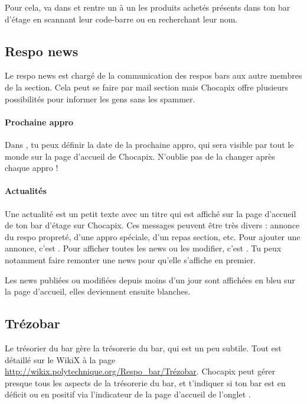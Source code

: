 \documentclass[12pt,french]{article}
\begin{document}
Pour cela, va dans  et rentre un à un les produits achetés présents dans ton bar d'étage en scannant leur code-barre ou en recherchant leur nom.

\subsection{Respo news}

Le respo news est chargé de la communication des respos bars aux autre membres de la section. Cela peut se faire par mail section mais Chocapix offre plusieurs possibilités pour informer les gens sans les spammer.

\paragraph{Prochaine appro} Dans , tu peux définir la date de la prochaine appro, qui sera visible par tout le monde sur la page d'accueil de Chocapix. N'oublie pas de la changer après chaque appro !

\paragraph{Actualités} Une actualité est un petit texte avec un titre qui est affiché sur la page d'accueil de ton bar d'étage sur Chocapix. Ces messages peuvent être très divers : annonce du respo propreté, d'une appro spéciale, d'un repas section, etc. Pour ajouter une annonce, c'est . Pour afficher toutes les news ou les modifier, c'est . Tu peux notamment faire remonter une news pour qu'elle s'affiche en premier.

Les news publiées ou modifiées depuis moins d'un jour sont affichées en bleu sur la page d'accueil, elles deviennent ensuite blanches.

\subsection{Trézobar}

Le trésorier du bar gère la trésorerie du bar, qui est un peu subtile. Tout est détaillé sur le WikiX à la page \url{http://wikix.polytechnique.org/Respo_bar/Trézobar}. Chocapix peut gérer presque tous les aspects de la trésorerie du bar, et t'indiquer si ton bar est en déficit ou en positif via l'indicateur de la page d'accueil de l'onglet .
\end{document}
